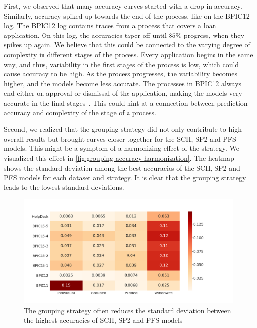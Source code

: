 First, we observed that many accuracy curves started with a drop in accuracy.
Similarly, accuracy spiked up towards the end of the process, like on the BPIC12 log.
The BPIC12 log contains traces from a process that covers a loan application.
On this log, the accuracies taper off until $85\%$ progress, when they spikes up again.
We believe that this could be connected to the varying degree of complexity in different stages of the process.
Every application begins in the same way, and thus, variability in the first stages of the process is low, which could cause accuracy to be high.
As the process progresses, the variability becomes higher, and the models become less accurate.
The processes in BPIC12 always end either on approval or dismissal of the application, making the models very accurate in the final stages~\cite{adriansyah2012mining}.
This could hint at a connection between prediction accuracy and complexity of the stage of a process.

Second, we realized that the grouping strategy did not only contribute to high overall results but brought curves closer together for the SCH, SP2 and PFS models.
This might be a symptom of a harmonizing effect of the strategy.
We visualized this effect in \autoref{fig:grouping-accuracy-harmonization}.
The heatmap shows the standard deviation among the best accuracies of the SCH, SP2 and PFS models for each dataset and strategy.
It is clear that the grouping strategy leads to the lowest standard deviations.

\begin{figure}
    \centering
    \includegraphics[width=\textwidth]{gfx/grouping-accuracy-harmonization.pdf}
    \caption[Batching strategy harmonizes top accuracies]{The grouping strategy often reduces the standard deviation between the highest accuracies of SCH, SP2 and PFS models}
    \label{fig:grouping-accuracy-harmonization}
\end{figure}

